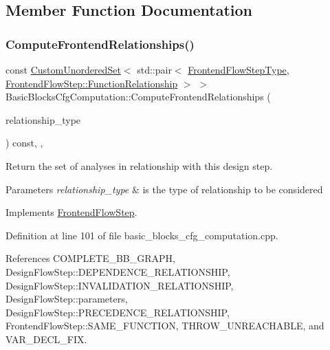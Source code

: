 \subsection{Member Function Documentation}
\mbox{\label{classBasicBlocksCfgComputation_a25a7032f4adc7cb581250474181ae924}} 
\subsubsection{\texorpdfstring{Compute\+Frontend\+Relationships()}{ComputeFrontendRelationships()}}
{\footnotesize\ttfamily const \hyperlink{classCustomUnorderedSet}{Custom\+Unordered\+Set}$<$ std\+::pair$<$ \hyperlink{frontend__flow__step_8hpp_afeb3716c693d2b2e4ed3e6d04c3b63bb}{Frontend\+Flow\+Step\+Type}, \hyperlink{classFrontendFlowStep_af7cf30f2023e5b99e637dc2058289ab0}{Frontend\+Flow\+Step\+::\+Function\+Relationship} $>$ $>$ Basic\+Blocks\+Cfg\+Computation\+::\+Compute\+Frontend\+Relationships (\begin{DoxyParamCaption}\item[{const \hyperlink{classDesignFlowStep_a723a3baf19ff2ceb77bc13e099d0b1b7}{Design\+Flow\+Step\+::\+Relationship\+Type}}]{relationship\+\_\+type }\end{DoxyParamCaption}) const\hspace{0.3cm}{\ttfamily [override]}, {\ttfamily [private]}, {\ttfamily [virtual]}}



Return the set of analyses in relationship with this design step. 


\begin{DoxyParams}{Parameters}
{\em relationship\+\_\+type} & is the type of relationship to be considered \\
\hline
\end{DoxyParams}


Implements \hyperlink{classFrontendFlowStep_abeaff70b59734e462d347ed343dd700d}{Frontend\+Flow\+Step}.



Definition at line 101 of file basic\+\_\+blocks\+\_\+cfg\+\_\+computation.\+cpp.



References C\+O\+M\+P\+L\+E\+T\+E\+\_\+\+B\+B\+\_\+\+G\+R\+A\+PH, Design\+Flow\+Step\+::\+D\+E\+P\+E\+N\+D\+E\+N\+C\+E\+\_\+\+R\+E\+L\+A\+T\+I\+O\+N\+S\+H\+IP, Design\+Flow\+Step\+::\+I\+N\+V\+A\+L\+I\+D\+A\+T\+I\+O\+N\+\_\+\+R\+E\+L\+A\+T\+I\+O\+N\+S\+H\+IP, Design\+Flow\+Step\+::parameters, Design\+Flow\+Step\+::\+P\+R\+E\+C\+E\+D\+E\+N\+C\+E\+\_\+\+R\+E\+L\+A\+T\+I\+O\+N\+S\+H\+IP, Frontend\+Flow\+Step\+::\+S\+A\+M\+E\+\_\+\+F\+U\+N\+C\+T\+I\+ON, T\+H\+R\+O\+W\+\_\+\+U\+N\+R\+E\+A\+C\+H\+A\+B\+LE, and V\+A\+R\+\_\+\+D\+E\+C\+L\+\_\+\+F\+IX.

